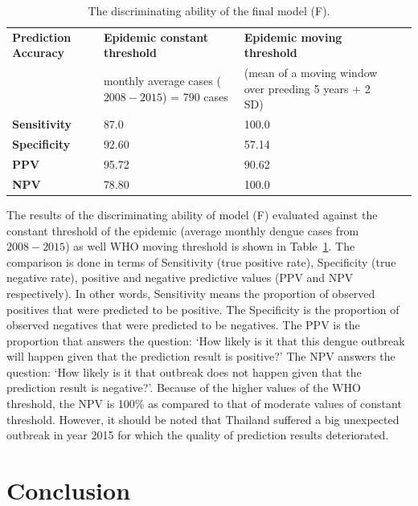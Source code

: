 \documentclass{bmcart}
\begin{document}
\begin{table}
	\centering
	\label{my-label}
	\begin{tabular}{|l|p{4.0cm}|p{4.0cm}|ll}
		\hline
		\textbf{Prediction Accuracy} & \textbf{Epidemic constant threshold}  & \textbf{Epidemic moving threshold} \\
		& monthly average cases ($2008-2015$) = 790 cases  & (mean of a moving window over preeding 5 years + 2 SD) \\  \cline{1-3}
		\textbf{Sensitivity} & 87.0  & 100.0  \\ 
		\textbf{Specificity} & 92.60 &  57.14  \\ 
		\textbf{PPV} & 95.72 &  90.62         \\ 
		\textbf{NPV} & 78.80  &  100.0        \\\cline{1-3}
	\end{tabular}
	\caption{The discriminating ability of the final model (F).} 
	\label{tab:resultsBinary}
\end{table}

The  results of the discriminating ability of model (F) evaluated against the constant threshold of the epidemic (average monthly dengue cases from $2008-2015$) as well WHO moving threshold is shown in Table~\ref{tab:resultsBinary}. The comparison is done in terms of Sensitivity (true positive rate), Specificity (true negative rate), positive and negative predictive values (PPV and NPV respectively).  In other words, Sensitivity means the proportion of observed positives that were predicted to be positive. The Specificity is the proportion of observed negatives that were predicted to be negatives. The PPV is the proportion that answers the question: `How likely is it that this dengue outbreak will happen given that the prediction result is positive?' The NPV answers the question: `How likely is it that outbreak does not happen given that the prediction result is negative?'. Because of the higher values of the WHO threshold, the NPV is 100\% as compared to that of moderate values of constant threshold. However, it should be noted that Thailand suffered a big unexpected outbreak in year 2015 for which the quality of prediction results deteriorated.




\section{Conclusion} \label{conclusion}
\end{document}
